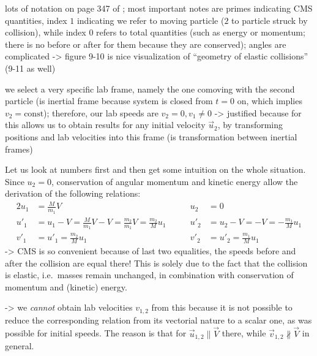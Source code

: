 \documentclass[../class_mech_main.tex]{subfiles}
\begin{document}
lots of notation on page 347 of \cite{Thornton_2003}; most important notes are primes indicating CMS quantities, index $1$ indicating we refer to moving particle ($2$ to particle struck by collision), while index $0$ refers to total quantities (such as energy or momentum; there is no before or after for them because they are conserved); angles are complicated -> figure 9-10 is nice visualization of \enquote{geometry of elastic collisions} (9-11 as well)



we select a very specific lab frame, namely the one comoving with the second particle (is inertial frame because system is closed from $t = 0$ on, which implies $v_2 = \text{const}$); therefore, our lab speeds are $v_2 = 0, v_1 \neq 0$ -> justified because for this allows us to obtain results for any initial velocity $\vec{u}_2$, by transforming positions and lab velocities into this frame (is transformation between inertial frames)



Let us look at numbers first and then get some intuition on the whole situation. Since $u_2 = 0$, %
conservation of angular momentum and kinetic energy allow the derivation of the following relations:
\begin{alignat}{2}
	u_1 &= \frac{M}{m_1} V
	&\qquad
	u_2 &= 0
	\\
	u'_1 &= u_1 - V = \frac{M}{m_1} V - V = \frac{m_2}{m_1} V = \frac{m_2}{M} u_1
	&\qquad
	u'_2 &= u_2 - V = - V = - \frac{m_1}{M} u_1
	\\
	v'_1 &= u'_1 = \frac{m_2}{M} u_1
	&\qquad
	v'_2 &= u'_2 = \frac{m_1}{M} u_1
\end{alignat}
-> CMS is so convenient because of last two equalities, the speeds before and after the collision are equal there! This is solely due to the fact that the collision is elastic, i.e.~masses remain unchanged, in combination with conservation of momentum and (kinetic) energy.

-> we \emph{cannot} obtain lab velocities $v_{1, 2}$ from this because it is not possible to reduce the corresponding relation from its vectorial nature to a scalar one, as was possible for initial speeds. The reason is that for $\vec{u}_{1, 2} \parallel \vec{V}$ there, while $\vec{v}_{1, 2} \nparallel \vec{V}$ in general.
\end{document}
